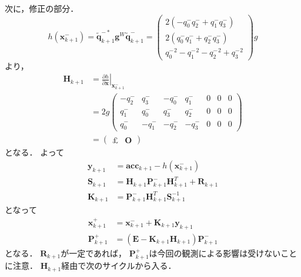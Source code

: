 次に，修正の部分．
\begin{equation}
  h(\boldsymbol{x}_{k+1}^{-}) = \tilde{\boldsymbol{q}}_{k+1}^{-\ast} \boldsymbol{g}^{W} \tilde{\boldsymbol{q}}_{k+1}^{-} =
  \begin{pmatrix}
    2\left(- q_0^{-} q_2^{-} + q_1^{-} q_3^{-}\right)\\
    2\left(q_0^{-} q_1^{-} + q_2^{-} q_3^{-}\right)\\
    {q_0^{-}}^2 - {q_1^{-}}^2 - {q_2^{-}}^2 + {q_3^{-}}^2
  \end{pmatrix}
  g
\end{equation}
より，
\begin{align}
  \boldsymbol{H}_{k+1} &= \left. \frac{\partial h}{\partial \boldsymbol{x}}\right|_{\boldsymbol{x}_{k+1}^{-}}\\
  &=
  2g
  \begin{pmatrix}
    -q_2^{-} &  q_3^{-} & -q_0^{-} &  q_1^{-} & 0 & 0 & 0\\
     q_1^{-} &  q_0^{-} &  q_3^{-} &  q_2^{-} & 0 & 0 & 0\\
     q_0^{-} & -q_1^{-} & -q_2^{-} & -q_3^{-} & 0 & 0 & 0
  \end{pmatrix}\\
  &=
  \begin{pmatrix}
    \pounds & \boldsymbol{O}
  \end{pmatrix}
\end{align}
となる．
よって
\begin{align}
  \boldsymbol{y}_{k+1} &= \boldsymbol{acc}_{k+1} - h(\boldsymbol{x}_{k+1}^{-})\\
  \boldsymbol{S}_{k+1} &= \boldsymbol{H}_{k+1} \boldsymbol{P}_{k+1}^{-} \boldsymbol{H}_{k+1}^{T} + \boldsymbol{R}_{k+1}\\
  \boldsymbol{K}_{k+1} &= \boldsymbol{P}_{k+1}^{-} \boldsymbol{H}_{k+1}^{T} \boldsymbol{S}_{k+1}^{-1}
\end{align}
となって
\begin{align}
  \boldsymbol{x}_{k+1}^{+} &= \boldsymbol{x}_{k+1}^{-} + \boldsymbol{K}_{k+1} \boldsymbol{y}_{k+1}\\
  \boldsymbol{P}_{k+1}^{+} &= \left(\boldsymbol{E} - \boldsymbol{K}_{k+1} \boldsymbol{H}_{k+1}\right) \boldsymbol{P}_{k+1}^{-}
\end{align}
となる．
$\boldsymbol{R}_{k+1}$が一定であれば，
$\boldsymbol{P}_{k+1}^{+}$は今回の観測による影響は受けないことに注意．
$\boldsymbol{H}_{k+1}$経由で次のサイクルから入る．

